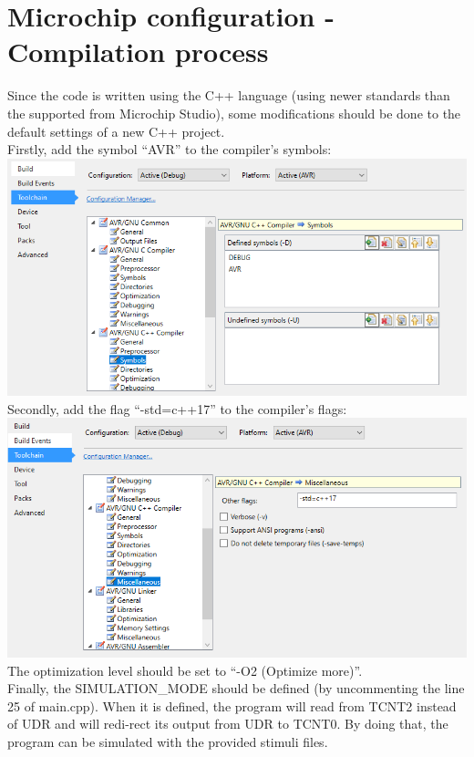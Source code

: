 \documentclass[12pt, a4, hidelinks]{article}
\begin{document}
\section*{Microchip configuration - Compilation process}
Since the code is written using the C++ language (using newer standards than the supported from Microchip Studio), some modifications should be done to the default settings of a new C++ project.  \\
Firstly, add the symbol “AVR” to the compiler’s symbols:\\
\includegraphics[scale=0.75]{CPP_AVR_SYMBOL.png} \\
Secondly, add the flag “-std=c++17” to the compiler’s flags:\\
\includegraphics[scale=0.75]{CPP_STD_17.png}  \\
The optimization level should be set to “-O2 (Optimize more)''.\\
Finally, the SIMULATION\_MODE should be defined (by uncommenting the line 25 of main.cpp). When it is defined, the program will read from TCNT2 instead of UDR and will redi-rect its output from UDR to TCNT0. By doing that, the program can be simulated with the provided stimuli files.
\end{document}
